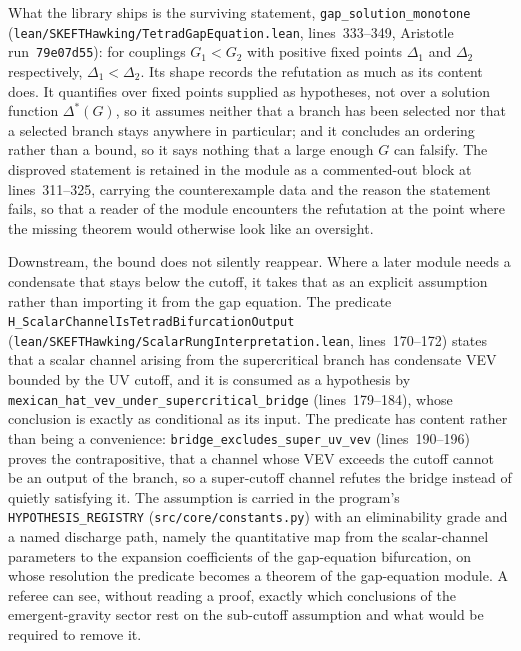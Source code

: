 \documentclass[11pt]{article}
\begin{document}
What the library ships is the surviving statement,
\texttt{gap\_solution\_monotone}
(\texttt{lean/SKEFTHawking/TetradGapEquation.lean}, lines~333--349,
Aristotle run~\texttt{79e07d55}): for couplings $G_1 < G_2$ with
positive fixed points $\Delta_1$ and $\Delta_2$ respectively,
$\Delta_1 < \Delta_2$. Its shape records the refutation as much as its
content does. It quantifies over fixed points supplied as hypotheses,
not over a solution function $\Delta^{\ast}(G)$, so it assumes neither
that a branch has been selected nor that a selected branch stays
anywhere in particular; and it concludes an ordering rather than a
bound, so it says nothing that a large enough $G$ can falsify. The
disproved statement is retained in the module as a commented-out block
at lines~311--325, carrying the counterexample data and the reason the
statement fails, so that a reader of the module encounters the
refutation at the point where the missing theorem would otherwise look
like an oversight.

Downstream, the bound does not silently reappear. Where a later module
needs a condensate that stays below the cutoff, it takes that as an
explicit assumption rather than importing it from the gap equation. The
predicate \texttt{H\_ScalarChannelIsTetradBifurcationOutput}
(\texttt{lean/SKEFTHawking/ScalarRungInterpretation.lean},
lines~170--172) states that a scalar channel arising from the
supercritical branch has condensate VEV bounded by the UV cutoff, and
it is consumed as a hypothesis by
\texttt{mexican\_hat\_vev\_under\_supercritical\_bridge}
(lines~179--184), whose conclusion is exactly as conditional as its
input. The predicate has content rather than being a convenience:
\texttt{bridge\_excludes\_super\_uv\_vev} (lines~190--196) proves the
contrapositive, that a channel whose VEV exceeds the cutoff cannot be
an output of the branch, so a super-cutoff channel refutes the bridge
instead of quietly satisfying it. The assumption is carried in the
program's \texttt{HYPOTHESIS\_REGISTRY} (\texttt{src/core/constants.py})
with an eliminability grade and a named discharge path, namely the
quantitative map from the scalar-channel parameters to the expansion
coefficients of the gap-equation bifurcation, on whose resolution the
predicate becomes a theorem of the gap-equation module. A referee can
see, without reading a proof, exactly which conclusions of the
emergent-gravity sector rest on the sub-cutoff assumption and what
would be required to remove it.
\end{document}
